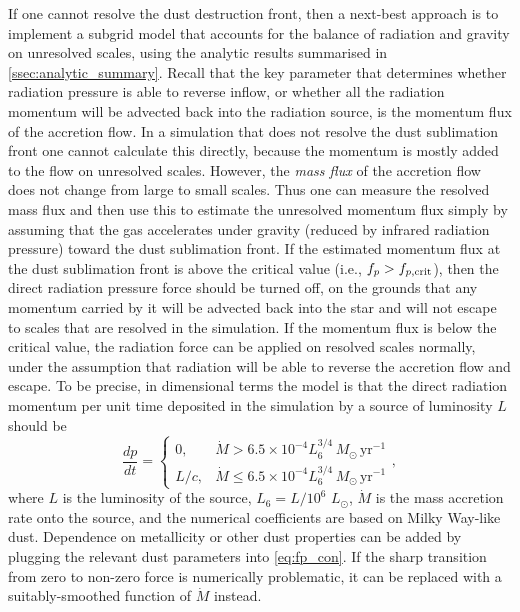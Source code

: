\documentclass[useAMS,usenatbib]{mn2e}
\begin{document}
If one cannot resolve the dust destruction front, then a next-best approach is to implement a subgrid model that accounts for the balance of radiation and gravity on unresolved scales, using the analytic results summarised in \autoref{ssec:analytic_summary}. Recall that the key parameter that determines whether radiation pressure is able to reverse inflow, or whether all the radiation momentum will be advected back into the radiation source, is the momentum flux of the accretion flow. In a simulation that does not resolve the dust sublimation front one cannot calculate this directly, because the momentum is mostly added to the flow on unresolved scales. However, the \textit{mass flux} of the accretion flow does not change from large to small scales. Thus one can measure the resolved mass flux and then use this to estimate the unresolved momentum flux simply by assuming that the gas accelerates under gravity (reduced by infrared radiation pressure) toward the dust sublimation front. If the estimated momentum flux at the dust sublimation front is above the critical value (i.e., $f_p > f_{p,\rm crit}$), then the direct radiation pressure force should be turned off, on the grounds that any momentum carried by it will be advected back into the star and will not escape to scales that are resolved in the simulation. If the momentum flux is below the critical value, the radiation force can be applied on resolved scales normally, under the assumption that radiation will be able to reverse the accretion flow and escape. To be precise, in dimensional terms the model is that the direct radiation momentum per unit time deposited in the simulation by a source of luminosity $L$ should be
\begin{equation}
\label{eq:acc_quench}
\frac{dp}{dt} = 
\left\{
\begin{array}{ll}
0, & \dot{M} > 6.5\times 10^{-4} L_6^{3/4}\,M_\odot\,\mathrm{yr}^{-1} \\
L/c, & \dot{M} \leq 6.5\times 10^{-4} L_6^{3/4}\,M_\odot\,\mathrm{yr}^{-1} 
\end{array}
\right.,
\end{equation}
where $L$ is the luminosity of the source, $L_6 = L/10^6$ $L_\odot$, $\dot{M}$ is the mass accretion rate onto the source, and the numerical coefficients are based on Milky Way-like dust. Dependence on metallicity or other dust properties can be added by plugging the relevant dust parameters into \autoref{eq:fp_con}. If the sharp transition from zero to non-zero force is numerically problematic, it can be replaced with a suitably-smoothed function of $\dot{M}$ instead.
\end{document}
